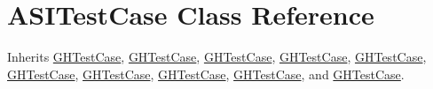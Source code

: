 \hypertarget{interface_a_s_i_test_case}{
\section{\-A\-S\-I\-Test\-Case \-Class \-Reference}
\label{interface_a_s_i_test_case}
}


\-Inherits \hyperlink{interface_g_h_test_case}{\-G\-H\-Test\-Case}, \hyperlink{interface_g_h_test_case}{\-G\-H\-Test\-Case}, \hyperlink{interface_g_h_test_case}{\-G\-H\-Test\-Case}, \hyperlink{interface_g_h_test_case}{\-G\-H\-Test\-Case}, \hyperlink{interface_g_h_test_case}{\-G\-H\-Test\-Case}, \hyperlink{interface_g_h_test_case}{\-G\-H\-Test\-Case}, \hyperlink{interface_g_h_test_case}{\-G\-H\-Test\-Case}, \hyperlink{interface_g_h_test_case}{\-G\-H\-Test\-Case}, \hyperlink{interface_g_h_test_case}{\-G\-H\-Test\-Case}, and \hyperlink{interface_g_h_test_case}{\-G\-H\-Test\-Case}.



